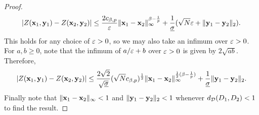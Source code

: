 \documentclass[12pt, twoside]{report}
\begin{document}
\begin{proof}
    \begin{equation}
        \lvert Z(\mathbf{x}_1, \mathbf{y}_1) - Z(\mathbf{x}_2, \mathbf{y}_2)\rvert
        \le 
            \frac{2 c_{\beta, p}}{\varepsilon} \lVert\mathbf{x}_1 - \mathbf{x}_2\rVert_\infty^{\beta - \frac{1}{p}}
            + \frac{1}{\underline{\sigma}}(\sqrt{N}\varepsilon + \lVert\mathbf{y}_1 - \mathbf{y}_2\rVert_2).
    \end{equation}
    This holds for any choice of $\varepsilon > 0$, so we may also take an infimum over $\varepsilon > 0$.
    For $a,b \ge 0$, note that the infimum of $a/\varepsilon + b$ over $\varepsilon > 0$ is given by $2 \sqrt{a b}$.
    Therefore,
    \begin{equation}
        \lvert Z(\mathbf{x}_1, \mathbf{y}_1) - Z(\mathbf{x}_2, \mathbf{y}_2)\rvert
        \le 
            \frac{2\sqrt{2}}{\sqrt{\underline{\sigma}}}
            (\sqrt{N} c_{\beta,p})^{\frac12}
            \lVert\mathbf{x}_1 - \mathbf{x}_2\rVert_\infty^{\frac12(\beta - \frac1p)}
            + \frac{1}{\underline{\sigma}}\lVert\mathbf{y}_1 - \mathbf{y}_2\rVert_2.
    \end{equation}
    Finally note that $\lVert\mathbf{x}_1 - \mathbf{x}_2\rVert_\infty < 1$ and $\lVert\mathbf{y}_1 - \mathbf{y}_2\rVert_2 < 1$ whenever $d_{\mathcal{D}}(D_1, D_2) <1$ to find the result.
\end{proof}
\end{document}

